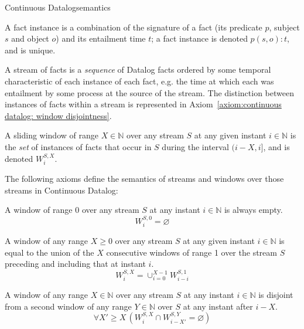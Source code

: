 \begin{nestedsection}{Continuous Datalog}{semantics}
\begin{definition}\label{def:continuous datalog: fact instance}
A fact instance is a combination of the signature of a fact (its
predicate $p$, subject $s$ and object $o$) and its entailment time
$t$; a fact instance is denoted ${p(s,o):t}$, and is unique.
\end{definition}

\begin{definition}\label{def:continuous datalog: stream}
A stream of facts is a \emph{sequence} of Datalog facts ordered by
some temporal characteristic of each instance of each fact, e.g. the
time at which each was entailment by some process at the source of the
stream.  The distinction between instances of facts within a
stream is represented in Axiom~\ref{axiom:continuous datalog: window disjointness}.
\end{definition}

\begin{definition}\label{def:continuous datalog: window}
A sliding window of range ${X \in \mathbb{N}}$ over any stream $S$ at
any given instant ${i \in \mathbb{N}}$ is the \emph{set} of instances
of facts that occur in $S$ during the interval ${(i-X,i]}$, and is
  denoted ${W^{S,X}_{i}}$.
\end{definition}

The following axioms define the semantics of streams and windows over
those streams in Continuous Datalog:

\begin{axiom}\label{axiom:continuous datalog: window range leq 0}
A window of range $0$ over any stream $S$ at any instant 
${i \in \mathbb{N}}$ is always empty.
\begin{equation*}
W^{S,0}_{i} = \varnothing
\end{equation*}
\end{axiom}

\begin{axiom}\label{axiom:continuous datalog: window composition}
A window of any range ${X \ge 0}$ over any stream $S$ at any
given instant ${i \in \mathbb{N}}$ is equal to the union of the
$X$ consecutive windows of range 1 over the stream $S$ preceding and
including that at instant $i$.
\begin{equation*}
W^{S,X}_{i} = \mathop{\cup}_{i=0}^{X-1} W^{S,1}_{i-i}
\end{equation*}
\end{axiom}

\begin{axiom}\label{axiom:continuous datalog: window disjointness}
A window of any range ${X \in \mathbb{N}}$ over any stream $S$ at any
instant ${i \in \mathbb{N}}$ is disjoint from a second window of any
range ${Y \in \mathbb{N}}$ over $S$ at any instant after ${i - X}$.
\begin{equation*}
\forall X' \geq X \, \left( W^{S,X}_{i} \cap W^{S,Y}_{i-X'} = \varnothing \right)
\end{equation*}
\end{axiom}


\end{nestedsection}
